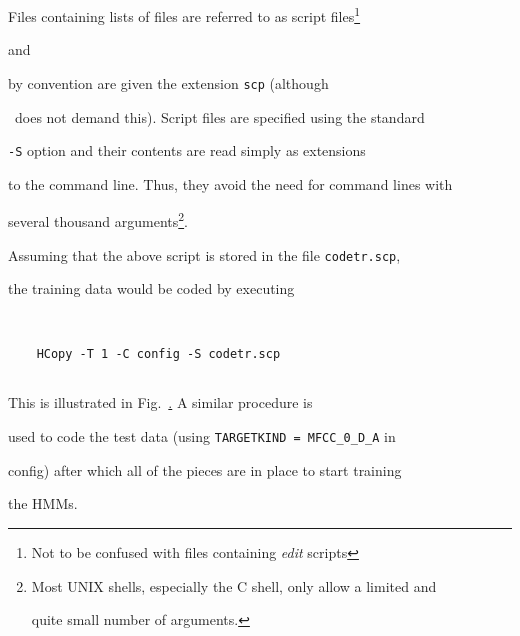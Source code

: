 Files containing lists of files are referred to as script files\footnote{


Not to be confused with files containing \textit{edit} scripts


}


and


by convention are given the extension \texttt{scp} (although 


\HTK\ does not demand this).  Script files are specified using the standard


\texttt{-S} option and their contents are read simply as extensions


to the command line.  Thus, they avoid the need for command lines with


several thousand arguments\footnote{


Most UNIX shells, especially the C shell, only allow a limited and


quite small number of arguments.}.












\noindent


Assuming that the above script is stored in the file \texttt{codetr.scp},


the training data would be coded by executing


\begin{verbatim}


    HCopy -T 1 -C config -S codetr.scp


\end{verbatim}


This is illustrated in Fig.~\href{f:step5}. A similar procedure is


used to code the test data (using \verb|TARGETKIND = MFCC_0_D_A| in


config) after which all of the pieces are in place to start training


the HMMs.


 










